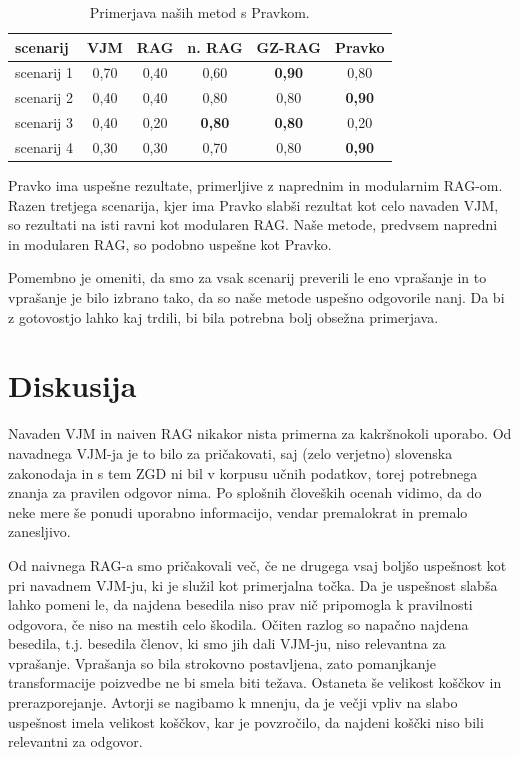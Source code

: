 \documentclass[a4paper,12pt,openright]{book}
\begin{document}
\begin{table}[H]
\centering
\caption{Primerjava naših metod s Pravkom.}
\begin{tabular}{|l|c|c|c|c|c|}
\hline
scenarij  & VJM & RAG & n. RAG & GZ-RAG & Pravko \\ \hline
scenarij 1   & 0,70     & 0,40     & 0,60     & \textbf{0,90}  &  0,80     \\ \hline
scenarij 2   & 0,40     & 0,40     & 0,80    & 0,80     & \textbf{0,90}     \\ \hline
scenarij 3   & 0,40     & 0,20     & \textbf{0,80}     & \textbf{0,80}  & 0,20     \\ \hline
scenarij 4   & 0,30     & 0,30     & 0,70    & 0,80     & \textbf{0,90}     \\ \hline
\end{tabular}
\end{table}

Pravko ima uspešne rezultate, primerljive z naprednim in modularnim RAG-om. Razen tretjega scenarija, kjer ima Pravko slabši rezultat kot celo navaden VJM, so rezultati na isti ravni kot modularen RAG. Naše metode, predvsem napredni in modularen RAG, so podobno uspešne kot Pravko.

Pomembno je omeniti, da smo za vsak scenarij preverili le eno vprašanje in to vprašanje je bilo izbrano tako, da so naše metode uspešno odgovorile nanj. Da bi z gotovostjo lahko kaj trdili, bi bila potrebna bolj obsežna primerjava.

\section{Diskusija}

Navaden VJM in naiven RAG nikakor nista primerna za kakršnokoli uporabo. Od navadnega VJM-ja je to bilo za pričakovati, saj (zelo verjetno) slovenska zakonodaja in s tem ZGD ni bil v korpusu učnih podatkov, torej potrebnega znanja za pravilen odgovor nima. Po splošnih človeških ocenah vidimo, da do neke mere še ponudi uporabno informacijo, vendar premalokrat in premalo zanesljivo.

Od naivnega RAG-a smo pričakovali več, če ne drugega vsaj boljšo uspešnost kot pri navadnem VJM-ju, ki je služil kot primerjalna točka. Da je uspešnost slabša lahko pomeni le, da najdena besedila niso prav nič pripomogla k pravilnosti odgovora, če niso na mestih celo škodila. Očiten razlog so napačno najdena besedila, t.j. besedila členov, ki smo jih dali VJM-ju, niso relevantna za vprašanje. Vprašanja so bila strokovno postavljena, zato pomanjkanje transformacije poizvedbe ne bi smela biti težava. Ostaneta še velikost koščkov in prerazporejanje. Avtorji se nagibamo k mnenju, da je večji vpliv na slabo uspešnost imela velikost koščkov, kar je povzročilo, da najdeni koščki niso bili relevantni za odgovor.
\end{document}
